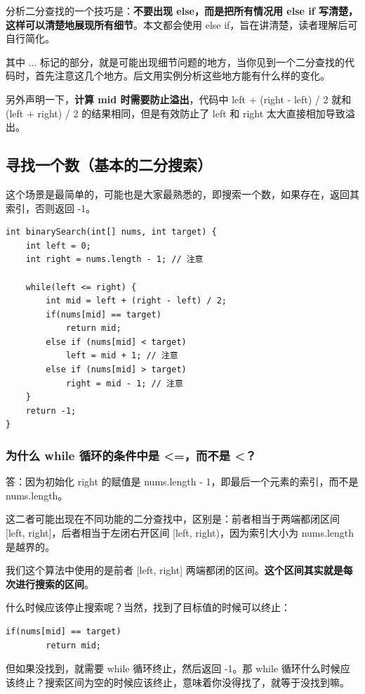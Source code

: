 \documentclass[12pt]{article}
\begin{document}
分析二分查找的一个技巧是：\textbf{不要出现 else，而是把所有情况用 else if 写清楚，这样可以清楚地展现所有细节}。本文都会使用 else if，旨在讲清楚，读者理解后可自行简化。

其中 ... 标记的部分，就是可能出现细节问题的地方，当你见到一个二分查找的代码时，首先注意这几个地方。后文用实例分析这些地方能有什么样的变化。

另外声明一下，\textbf{计算 mid 时需要防止溢出}，代码中 left + (right - left) / 2 就和 (left + right) / 2 的结果相同，但是有效防止了 left 和 right 太大直接相加导致溢出。

\subsection{寻找一个数（基本的二分搜索）}
这个场景是最简单的，可能也是大家最熟悉的，即搜索一个数，如果存在，返回其索引，否则返回 -1。
\begin{lstlisting}
int binarySearch(int[] nums, int target) {
    int left = 0; 
    int right = nums.length - 1; // 注意

    while(left <= right) {
        int mid = left + (right - left) / 2;
        if(nums[mid] == target)
            return mid; 
        else if (nums[mid] < target)
            left = mid + 1; // 注意
        else if (nums[mid] > target)
            right = mid - 1; // 注意
    }
    return -1;
}
\end{lstlisting}

\subsubsection{为什么 while 循环的条件中是 <=，而不是 <？}
答：因为初始化 right 的赋值是 nums.length - 1，即最后一个元素的索引，而不是 nums.length。

这二者可能出现在不同功能的二分查找中，区别是：前者相当于两端都闭区间 [left, right]，后者相当于左闭右开区间 [left, right)，因为索引大小为 nums.length 是越界的。

我们这个算法中使用的是前者 [left, right] 两端都闭的区间。\textbf{这个区间其实就是每次进行搜索的区间}。

什么时候应该停止搜索呢？当然，找到了目标值的时候可以终止：
\begin{lstlisting}
if(nums[mid] == target)
        return mid; 
\end{lstlisting}

但如果没找到，就需要 while 循环终止，然后返回 -1。那 while 循环什么时候应该终止？搜索区间为空的时候应该终止，意味着你没得找了，就等于没找到嘛。
\end{document}
